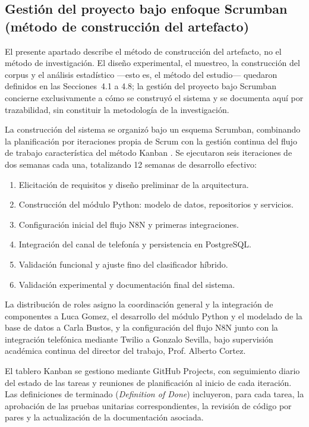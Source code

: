 \subsection{Gestión del proyecto bajo enfoque Scrumban (método de construcción del artefacto)}\label{subsec:gestion-scrumban}

El presente apartado describe el método de construcción del artefacto, no el método de investigación. El diseño experimental, el muestreo, la construcción del corpus y el análisis estadístico ---esto es, el método del estudio--- quedaron definidos en las Secciones~4.1 a 4.8; la gestión del proyecto bajo Scrumban concierne exclusivamente a cómo se construyó el sistema y se documenta aquí por trazabilidad, sin constituir la metodología de la investigación.

La construcción del sistema se organizó bajo un esquema Scrumban, combinando la planificación por iteraciones propia de Scrum con la gestión continua del flujo de trabajo característica del método Kanban \parencite{Ladas2009_scrumban}. Se ejecutaron seis iteraciones de dos semanas cada una, totalizando 12 semanas de desarrollo efectivo:

\begin{enumerate}[label=Iteración \arabic*:, leftmargin=*]
  \item Elicitación de requisitos y diseño preliminar de la arquitectura.
  \item Construcción del módulo Python: modelo de datos, repositorios y servicios.
  \item Configuración inicial del flujo N8N y primeras integraciones.
  \item Integración del canal de telefonía y persistencia en PostgreSQL.
  \item Validación funcional y ajuste fino del clasificador híbrido.
  \item Validación experimental y documentación final del sistema.
\end{enumerate}

La distribución de roles asigno la coordinación general y la integración de componentes a Luca Gomez, el desarrollo del módulo Python y el modelado de la base de datos a Carla Bustos, y la configuración del flujo N8N junto con la integración telefónica mediante Twilio a Gonzalo Sevilla, bajo supervisión académica continua del director del trabajo, Prof. Alberto Cortez.

El tablero Kanban se gestiono mediante GitHub Projects, con seguimiento diario del estado de las tareas y reuniones de planificación al inicio de cada iteración. Las definiciones de terminado (\emph{Definition of Done}) incluyeron, para cada tarea, la aprobación de las pruebas unitarias correspondientes, la revisión de código por pares y la actualización de la documentación asociada.

\newpage

